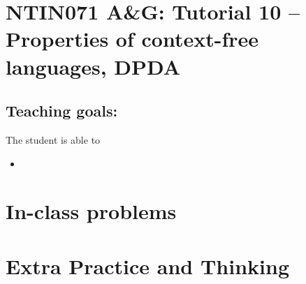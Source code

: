 \documentclass[a4paper,12pt]{amsart}
\begin{document}
\thispagestyle{empty}

\section*{NTIN071 A\&G: Tutorial 10 -- Properties of context-free languages, DPDA}

\medskip

\subsection*{Teaching goals:} The student is able to

    \begin{itemize}\setlength{\itemsep}{0pt}
        \item 
    \end{itemize}


\section*{In-class problems}


\medskip\begin{problem}

\end{problem}


\section*{Extra Practice and Thinking}


\medskip\begin{problem}

\end{problem}
\end{document}
